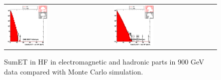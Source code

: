 \begin{figure}[h!]
 \centering
 \begin{tabular}{ll}
  \includegraphics[width=0.40\textwidth]{plots_DataVsMC_MB_900GeV/h_caloSumetEmHF.eps} &
  \includegraphics[width=0.40\textwidth]{plots_DataVsMC_MB_900GeV/h_caloSumetHadHF.eps} \\
 \end{tabular}
 \caption{SumET in HF in electromagnetic and hadronic parts in 900 GeV data compared
   with Monte Carlo simulation.
          \label{fig:DataVsMC_MB_900_6}}
\end{figure}


